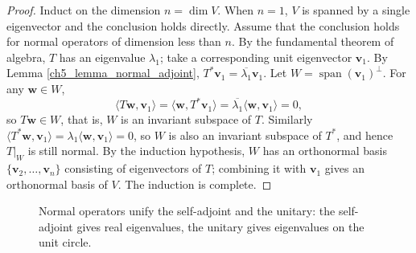 \begin{proof}
Induct on the dimension $n = \dim V$. When $n=1$, $V$ is spanned by a single eigenvector and the conclusion holds directly. Assume that the conclusion holds for normal operators of dimension less than $n$. By the fundamental theorem of algebra, $T$ has an eigenvalue $\lambda_1$; take a corresponding unit eigenvector $\mathbf{v}_1$. By Lemma \ref{ch5_lemma_normal_adjoint}, $T^*\mathbf{v}_1 = \overline{\lambda_1}\mathbf{v}_1$. Let $W = \operatorname{span}(\mathbf{v}_1)^\perp$. For any $\mathbf{w} \in W$,
\[
\langle T\mathbf{w}, \mathbf{v}_1 \rangle = \langle \mathbf{w}, T^*\mathbf{v}_1 \rangle = \overline{\lambda_1}\langle \mathbf{w}, \mathbf{v}_1 \rangle = 0,
\]
so $T\mathbf{w} \in W$, that is, $W$ is an invariant subspace of $T$. Similarly $\langle T^*\mathbf{w}, \mathbf{v}_1\rangle = \lambda_1\langle \mathbf{w}, \mathbf{v}_1\rangle = 0$, so $W$ is also an invariant subspace of $T^*$, and hence $T|_W$ is still normal. By the induction hypothesis, $W$ has an orthonormal basis $\{\mathbf{v}_2, \dots, \mathbf{v}_n\}$ consisting of eigenvectors of $T$; combining it with $\mathbf{v}_1$ gives an orthonormal basis of $V$. The induction is complete.
\end{proof}

\begin{figure}[htbp]
\centering
{}
\caption{Normal operators unify the self-adjoint and the unitary: the self-adjoint gives real eigenvalues, the unitary gives eigenvalues on the unit circle.}
\label{fig:normal_operator}
\end{figure}

